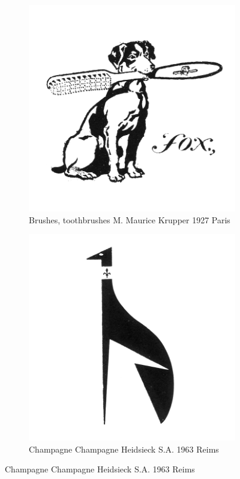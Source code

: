 \begin{figure}[h]
  \centering
  \begin{subfigure}{.45\textwidth}
    \centering
    \includegraphics[width=.5\linewidth]{images/supplement/trademarks/french/10_131}
    \caption{Brushes, toothbrushes M. Maurice Krupper 1927 Paris}
    \label{fig:trademarks:french:10.131}
  \end{subfigure}\hfill
  \begin{subfigure}{.45\textwidth}
    \centering
    \includegraphics[width=.5\linewidth]{images/supplement/trademarks/french/10_138}
    \caption{Champagne Champagne Heidsieck S.A. 1963 Reims}
    \label{fig:trademarks:french:10.138}
  \end{subfigure}


\end{figure}
